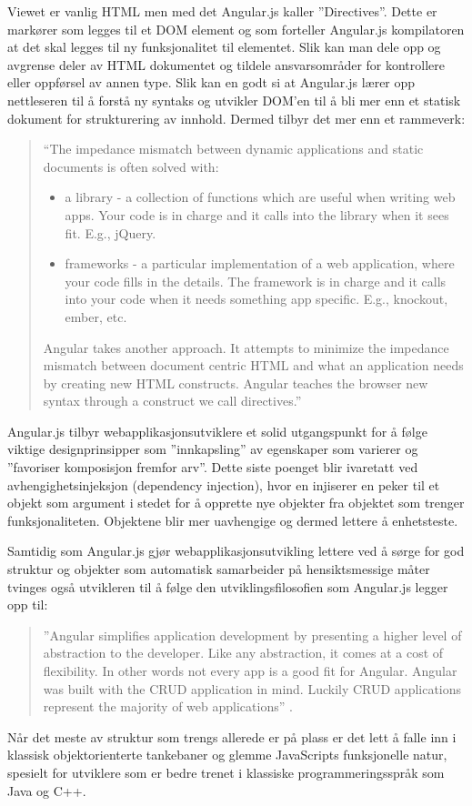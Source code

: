 \documentclass[norsk]{article}
\begin{document}
Viewet er vanlig HTML men med det Angular.js kaller ”Directives”. Dette er markører som legges til et DOM element og som forteller Angular.js kompilatoren at det skal legges til ny funksjonalitet til elementet. Slik kan man dele opp og avgrense deler av HTML dokumentet og tildele ansvarsområder for kontrollere eller oppførsel av annen type. Slik kan en godt si at Angular.js lærer opp nettleseren til å forstå ny syntaks og utvikler DOM’en til å bli mer enn et statisk dokument for strukturering av innhold. Dermed tilbyr det mer enn et rammeverk: 
\begin{quotation}

“The impedance mismatch between dynamic applications and static documents is often solved with:
\begin{itemize}
\item
a library - a collection of functions which are useful when writing web apps. Your        code is in charge and it calls into the library when it sees fit. E.g., jQuery.
\item
frameworks - a particular implementation of a web application, where your code fills in the details. The framework is in charge and it calls into your code when it needs something app specific. E.g., knockout, ember, etc.
\end{itemize}
Angular takes another approach. It attempts to minimize the impedance mismatch between document centric HTML and what an application needs by creating new HTML constructs. Angular teaches the browser new syntax through a construct we call directives.” \parencite{angularIntro}
\end{quotation}

Angular.js tilbyr webapplikasjonsutviklere et solid utgangspunkt for å
følge viktige designprinsipper som ”innkapsling” av egenskaper som
varierer og ”favoriser komposisjon fremfor arv”. Dette siste poenget
blir ivaretatt ved avhengighetsinjeksjon (dependency injection), hvor
en injiserer en peker til et objekt som argument i stedet for å
opprette nye objekter fra objektet som trenger
funksjonaliteten. Objektene blir mer uavhengige og dermed lettere å
enhetsteste.

Samtidig som Angular.js gjør webapplikasjonsutvikling lettere ved å sørge for god struktur og objekter som automatisk samarbeider på hensiktsmessige måter tvinges også utvikleren til å følge den utviklingsfilosofien som Angular.js legger opp til:
\begin{quotation}
”Angular simplifies application development by presenting a higher level of abstraction to the developer. Like any abstraction, it comes at a cost of flexibility. In other words not every app is a good fit for Angular. Angular was built with the CRUD application in mind. Luckily CRUD applications represent the majority of web applications” \parencite{angularIntro}.
\end{quotation} 
Når det meste av struktur som trengs allerede er på plass er det lett å falle inn i klassisk objektorienterte tankebaner og glemme JavaScripts funksjonelle natur, spesielt for utviklere som er bedre trenet i klassiske programmeringsspråk som Java og C++.
\end{document}
